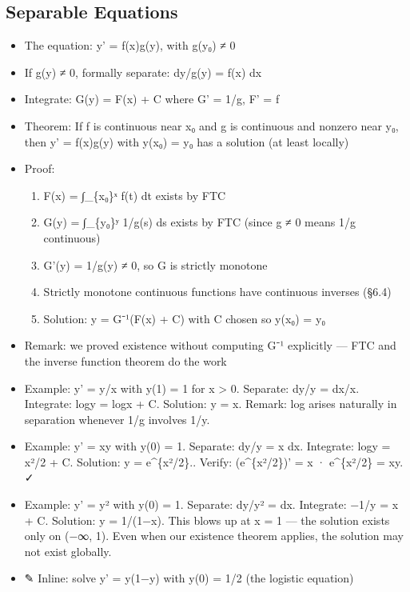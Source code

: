 \documentclass[
  10pt,
  letterpaper,
]{scrbook}
\providecommand{\tightlist}{%
  \setlength{\itemsep}{0pt}\setlength{\parskip}{0pt}}
\begin{document}
\subsection{Separable Equations}\label{separable-equations}

\begin{itemize}
\tightlist
\item
  The equation: y' = f(x)g(y), with g(y₀) ≠ 0
\item
  If g(y) ≠ 0, formally separate: dy/g(y) = f(x) dx
\item
  Integrate: G(y) = F(x) + C where G' = 1/g, F' = f
\item
  Theorem: If f is continuous near x₀ and g is continuous and nonzero
  near y₀, then y' = f(x)g(y) with y(x₀) = y₀ has a solution (at least
  locally)
\item
  Proof:

  \begin{enumerate}
  \def\labelenumi{\arabic{enumi}.}
  \tightlist
  \item
    F(x) = ∫\_\{x₀\}ˣ f(t) dt exists by FTC
  \item
    G(y) = ∫\_\{y₀\}ʸ 1/g(s) ds exists by FTC (since g ≠ 0 means 1/g
    continuous)
  \item
    G'(y) = 1/g(y) ≠ 0, so G is strictly monotone
  \item
    Strictly monotone continuous functions have continuous inverses
    (§6.4)
  \item
    Solution: y = G⁻¹(F(x) + C) with C chosen so y(x₀) = y₀
  \end{enumerate}
\item
  Remark: we proved existence without computing G⁻¹ explicitly --- FTC
  and the inverse function theorem do the work
\item
  Example: y' = y/x with y(1) = 1 for x \textgreater{} 0. Separate: dy/y
  = dx/x. Integrate: log\textbar y\textbar{} = log\textbar x\textbar{} +
  C. Solution: y = x. Remark: log arises naturally in separation
  whenever 1/g involves 1/y.
\item
  Example: y' = xy with y(0) = 1. Separate: dy/y = x dx. Integrate:
  log\textbar y\textbar{} = x²/2 + C. Solution: y = e\^{}\{x²/2\}..
  Verify: (e\^{}\{x²/2\})' = x · e\^{}\{x²/2\} = xy. ✓
\item
  Example: y' = y² with y(0) = 1. Separate: dy/y² = dx. Integrate: −1/y
  = x + C. Solution: y = 1/(1−x). This blows up at x = 1 --- the
  solution exists only on (−∞, 1). Even when our existence theorem
  applies, the solution may not exist globally.
\item
  ✎ Inline: solve y' = y(1−y) with y(0) = 1/2 (the logistic equation)
\end{itemize}
\end{document}
